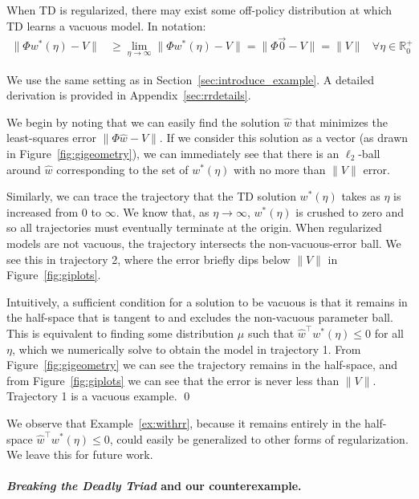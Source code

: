 \begin{example}
  \label{ex:withrr}
  When TD is regularized, there may exist some off-policy distribution at which TD learns a vacuous model. In notation:
  \begin{align}
    \|\Phi w^*(\eta) - V\| & \geq \lim_{\eta\to\infty} \|\Phi w^*(\eta) - V \| = \|\Phi \vec 0 - V \| = \|V \| & \forall \eta\in\mathbb{R}_0^+ \label{eqn:vacuoustd}
  \end{align}

  \vspace{-1.25em}
  \proof We use the same setting as in Section~\ref{sec:introduce_example}. A detailed derivation is provided in Appendix~\ref{sec:rrdetails}.

  We begin by noting that we can easily find the solution $\hat w$ that minimizes the least-squares error $\|\Phi \hat w - V\|$. If we consider this solution as a vector (as drawn in Figure~\ref*{fig:gigeometry}), we can immediately see that there is an $\ell_2$-ball around $\hat w$ corresponding to the set of $w^*(\eta)$ with no more than $\|V\|$ error.

  Similarly, we can trace the trajectory that the TD solution $w^*(\eta)$ takes as $\eta$ is increased from 0 to $\infty$. We know that, as $\eta\to\infty$, $w^*(\eta)$ is crushed to zero and so all trajectories must eventually terminate at the origin. When regularized models are not vacuous, the trajectory intersects the non-vacuous-error ball. We see this in trajectory 2, where the error briefly dips below $\|V\|$ in Figure~\ref{fig:giplots}.

  Intuitively, a sufficient condition for a solution to be vacuous is that it remains in the half-space that is tangent to and excludes the non-vacuous parameter ball. This is equivalent to finding some distribution $\mu$ such that $\hat w^\top w^*(\eta) \leq 0$ for all $\eta$, which we numerically solve to obtain the model in trajectory 1. From Figure~\ref{fig:gigeometry} we can see the trajectory remains in the half-space, and from Figure~\ref{fig:giplots} we can see that the error is never less than $\|V\|$. Trajectory 1 is a vacuous example. \qed
\end{example}

We observe that Example~\ref*{ex:withrr}, because it remains entirely in the half-space $\hat w^\top w^*(\eta) \leq 0$, could easily be generalized to other forms of regularization. We leave this for future work.


\paragraph{\emph{Breaking the Deadly Triad} and our counterexample.}

